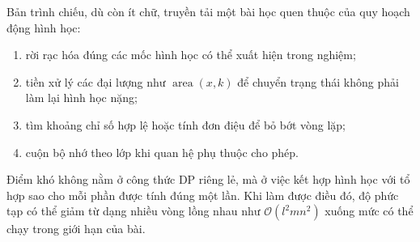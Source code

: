 \documentclass[11pt]{article}
\newcommand{\Oh}{\mathcal{O}}
\begin{document}
Bản trình chiếu, dù còn ít chữ, truyền tải một bài học quen thuộc của quy
hoạch động hình học:
\begin{enumerate}
  \item rời rạc hóa đúng các mốc hình học có thể xuất hiện trong nghiệm;
  \item tiền xử lý các đại lượng như \(\operatorname{area}(x,k)\) để chuyển
  trạng thái không phải làm lại hình học nặng;
  \item tìm khoảng chỉ số hợp lệ hoặc tính đơn điệu để bỏ bớt vòng lặp;
  \item cuộn bộ nhớ theo lớp khi quan hệ phụ thuộc cho phép.
\end{enumerate}

Điểm khó không nằm ở công thức DP riêng lẻ, mà ở việc kết hợp hình học với tổ
hợp sao cho mỗi phần được tính đúng một lần. Khi làm được điều đó, độ phức
tạp có thể giảm từ dạng nhiều vòng lồng nhau như \(\Oh(l^2mn^2)\) xuống mức
có thể chạy trong giới hạn của bài.
\end{document}
